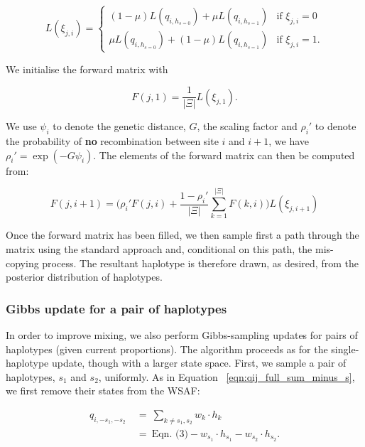 \documentclass{article}
\begin{document}
\begin{equation}
L(\xi_{j,i}) =
\begin{cases}
(1-\mu) L(q_{i,h_{s=0}})+\mu L(q_{i,h_{s=1}}) & \text{if $\xi_{j,i}=0$}\\
\mu L(q_{i,h_{s=0}})+(1-\mu) L(q_{i,h_{s=1}}) & \text{if $\xi_{j,i}=1$}.
\end{cases}
\label{eqn:emiss_1hap}
\end{equation}

\noindent We initialise the forward matrix with

\begin{equation}
F(j,1)=\frac{1}{|\Xi|}L(\xi_{j,1}).
\end{equation}

\noindent We use $\psi_i$ to denote the genetic distance, $G$, the scaling factor and $\rho_i'$ to denote the probability of \textbf{no} recombination between site $i$ and $i+1$, we have $\rho_i' = \exp(-G \psi_i)$.  The elements of the forward matrix can then be computed from:

\begin{equation}
F(j,i+1)=\big(\rho_i' F(j,i) + \frac{1-\rho_i'}{|\Xi|}\sum_{k=1}^{|\Xi|}F(k,i)\big) L(\xi_{j,i+1})
\end{equation}


Once the forward matrix has been filled, we then sample first a path through the matrix using the standard approach and, conditional on this path, the mis-copying process.  The resultant haplotype is therefore drawn, as desired, from the posterior distribution of haplotypes.



\subsubsection{Gibbs update for a pair of haplotypes}\label{sec:deconvolute}

In order to improve mixing, we also perform Gibbs-sampling updates for pairs of haplotypes (given current proportions). The algorithm proceeds as for the single-haplotype update, though with a larger state space.  First, we sample a pair of haplotypes, $s_1$ and $s_2$, uniformly. As in Equation ~\eqref{eqn:qij_full_sum_minus_s}, we first remove their states from the WSAF:

\begin{equation}
\begin{split}
q_{i,-s_1, -s_2} & ~ = ~ \sum_{k\neq s_1,s_2} w_k \cdot h_k \\
                 & ~ = ~ \textrm{Eqn.~(3)} - w_{s_1} \cdot h_{s_1} - w_{s_2} \cdot h_{s_2}.
\label{eqn:qij_full_sum_minus_s1_s2}
\end{split}
\end{equation}
\end{document}
